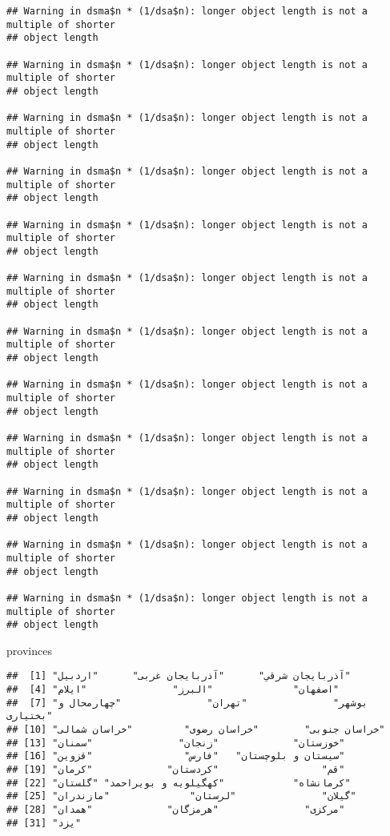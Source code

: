 \documentclass[
]{article}
\newenvironment{Shaded}{\begin{snugshade}}{\end{snugshade}}
\newcommand{\NormalTok}[1]{#1}
\begin{document}
\begin{verbatim}
## Warning in dsma$n * (1/dsa$n): longer object length is not a multiple of shorter
## object length

## Warning in dsma$n * (1/dsa$n): longer object length is not a multiple of shorter
## object length

## Warning in dsma$n * (1/dsa$n): longer object length is not a multiple of shorter
## object length

## Warning in dsma$n * (1/dsa$n): longer object length is not a multiple of shorter
## object length

## Warning in dsma$n * (1/dsa$n): longer object length is not a multiple of shorter
## object length

## Warning in dsma$n * (1/dsa$n): longer object length is not a multiple of shorter
## object length

## Warning in dsma$n * (1/dsa$n): longer object length is not a multiple of shorter
## object length

## Warning in dsma$n * (1/dsa$n): longer object length is not a multiple of shorter
## object length

## Warning in dsma$n * (1/dsa$n): longer object length is not a multiple of shorter
## object length

## Warning in dsma$n * (1/dsa$n): longer object length is not a multiple of shorter
## object length

## Warning in dsma$n * (1/dsa$n): longer object length is not a multiple of shorter
## object length

## Warning in dsma$n * (1/dsa$n): longer object length is not a multiple of shorter
## object length
\end{verbatim}

\begin{Shaded}
\begin{Highlighting}[]
\NormalTok{provinces}
\end{Highlighting}
\end{Shaded}

\begin{verbatim}
##  [1] "آذربايجان شرقي"      "آذربايجان غربی"      "اردبیل"             
##  [4] "اصفهان"              "البرز"               "ایلام"              
##  [7] "بوشهر"               "تهران"               "چهارمحال و بختیاری" 
## [10] "خراسان جنوبی"        "خراسان رضوی"         "خراسان شمالی"       
## [13] "خوزستان"             "زنجان"               "سمنان"              
## [16] "سیستان و بلوچستان"   "فارس"                "قزوین"              
## [19] "قم"                  "کردستان"             "کرمان"              
## [22] "کرمانشاه"            "کهگیلویه و بویراحمد" "گلستان"             
## [25] "گیلان"               "لرستان"              "مازندران"           
## [28] "مرکزی"               "هرمزگان"             "همدان"              
## [31] "یزد"
\end{verbatim}
\end{document}
